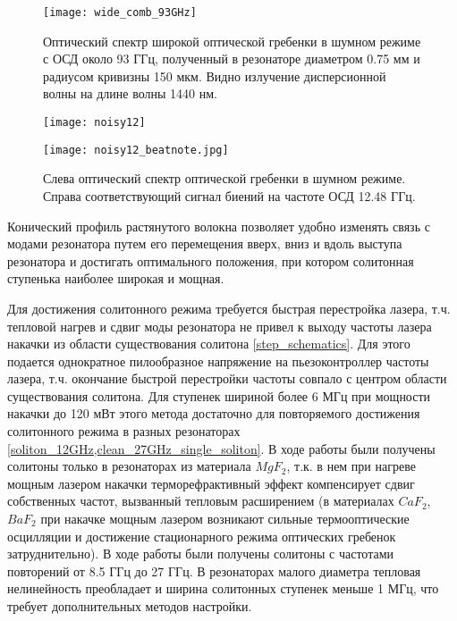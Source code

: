 \begin{figure}[ht]
\centering
  \texttt{[image: wide\_comb\_93GHz]}
  \caption{Оптический спектр широкой оптической гребенки в шумном режиме с ОСД около 93 ГГц, полученный в резонаторе диаметром 0.75 мм и радиусом кривизны 150 мкм. Видно излучение дисперсионной волны на длине волны 1440 нм.}
  \label{wide_comb_93GHz}
\end{figure}

\begin{figure}[ht]
  \begin{minipage}[ht]{0.49\linewidth}\centering
    \texttt{[image: noisy12]}
  \end{minipage}
  \hfill
  \begin{minipage}[ht]{0.49\linewidth}\centering
    \texttt{[image: noisy12\_beatnote.jpg]}
  \end{minipage}
  \caption{Слева оптический спектр оптической гребенки в шумном режиме. Справа соответствующий сигнал биений на частоте ОСД 12.48 ГГц.}
  \label{noisy12}
\end{figure}

Конический профиль растянутого волокна позволяет удобно изменять связь с модами резонатора путем его перемещения вверх, вниз и вдоль выступа резонатора и достигать оптимального положения, при котором солитонная ступенька наиболее широкая и мощная.

Для достижения солитонного режима требуется быстрая перестройка лазера, т.ч. тепловой нагрев и сдвиг моды резонатора не привел к выходу частоты лазера накачки из области существования солитона \ref{step_schematics}. Для этого подается однократное пилообразное напряжение на пьезоконтроллер частоты лазера, т.ч. окончание быстрой перестройки частоты совпало с центром области существования солитона. Для ступенек шириной более 6 МГц при мощности накачки до 120 мВт этого метода достаточно для повторяемого достижения солитонного режима в разных резонаторах \ref{soliton_12GHz,clean_27GHz_single_soliton}. В ходе работы были получены солитоны только в резонаторах из материала $MgF_2$, т.к. в нем при нагреве мощным лазером накачки терморефрактивный эффект компенсирует сдвиг собственных частот, вызванный тепловым расширением (в материалах $CaF_2$,$BaF_2$ при накачке мощным лазером возникают сильные термооптические осцилляции и достижение стационарного режима оптических гребенок затруднительно). В ходе работы были получены солитоны с частотами повторений от 8.5 ГГц до 27 ГГц. В резонаторах малого диаметра тепловая нелинейность преобладает и ширина солитонных ступенек меньше 1 МГц, что требует дополнительных методов настройки.

